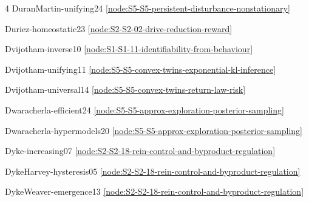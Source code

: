 \documentclass[10pt]{article}
\begin{document}
{\begin{multicols}{4}
DuranMartin-unifying24 \hfill \ref{node:S5-S5-persistent-disturbance-nonstationary}\par
Duriez-homeostatic23 \hfill \ref{node:S2-S2-02-drive-reduction-reward}\par
Dvijotham-inverse10 \hfill \ref{node:S1-S1-11-identifiability-from-behaviour}\par
Dvijotham-unifying11 \hfill \ref{node:S5-S5-convex-twins-exponential-kl-inference}\par
Dvijotham-universal14 \hfill \ref{node:S5-S5-convex-twins-return-law-risk}\par
Dwaracherla-efficient24 \hfill \ref{node:S5-S5-approx-exploration-posterior-sampling}\par
Dwaracherla-hypermodels20 \hfill \ref{node:S5-S5-approx-exploration-posterior-sampling}\par
Dyke-increasing07 \hfill \ref{node:S2-S2-18-rein-control-and-byproduct-regulation}\par
DykeHarvey-hysteresis05 \hfill \ref{node:S2-S2-18-rein-control-and-byproduct-regulation}\par
DykeWeaver-emergence13 \hfill \ref{node:S2-S2-18-rein-control-and-byproduct-regulation}\par


\end{multicols}}
\end{document}
